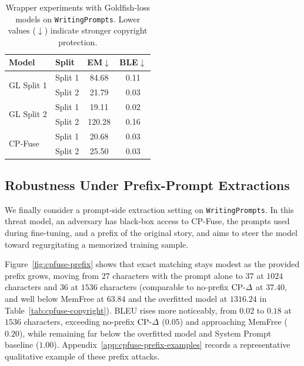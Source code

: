 \begin{table}[!tbp]
\centering
\caption{Wrapper experiments with Goldfish-loss models on \texttt{WritingPrompts}. Lower values (\(\downarrow\)) indicate stronger copyright protection.}
\label{tab:cpfuse-goldfish}
\begin{tabular}{llcc}
\toprule
\textbf{Model} & \textbf{Split} & \textbf{EM}\(\downarrow\) & \textbf{BLE}\(\downarrow\) \\
\midrule
\multirow{2}{*}{GL Split 1}
& Split 1 & 84.68 & 0.11 \\
& Split 2 & 21.79 & 0.03 \\
\midrule
\multirow{2}{*}{GL Split 2}
& Split 1 & 19.11 & 0.02 \\
& Split 2 & 120.28 & 0.16 \\
\midrule
\multirow{2}{*}{CP-Fuse}
& Split 1 & 20.68 & 0.03 \\
& Split 2 & 25.50 & 0.03 \\
\bottomrule
\end{tabular}
\end{table}

\subsection{Robustness Under Prefix-Prompt Extractions}
\label{sec:cpfuse-prefix-robustness}

We finally consider a prompt-side extraction setting on \texttt{WritingPrompts}. In this threat model, an adversary has black-box access to CP-Fuse, the prompts used during fine-tuning, and a prefix of the original story, and aims to steer the model toward regurgitating a memorized training sample.

Figure~\ref{fig:cpfuse-prefix} shows that exact matching stays modest as the provided prefix grows, moving from \(27\) characters with the prompt alone to \(37\) at \(1024\) characters and \(36\) at \(1536\) characters (comparable to no-prefix \(\text{CP-}\Delta\) at \(37.40\), and well below MemFree at \(63.84\) and the overfitted model at \(1316.24\) in Table~\ref{tab:cpfuse-copyright}). BLEU rises more noticeably, from \(0.02\) to \(0.18\) at \(1536\) characters, exceeding no-prefix \(\text{CP-}\Delta\) (\(0.05\)) and approaching MemFree (\(0.20\)), while remaining far below the overfitted model and System Prompt baseline (\(1.00\)). Appendix~\ref{app:cpfuse-prefix-examples} records a representative qualitative example of these prefix attacks.

